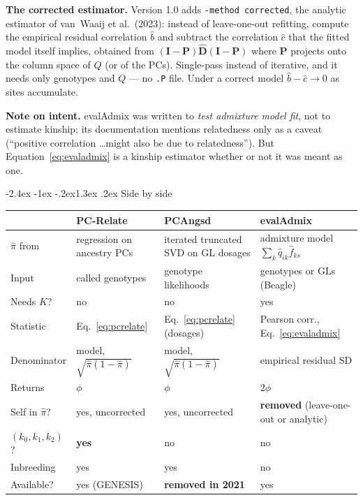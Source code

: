 \documentclass[10pt,a4paper]{article}
\makeatletter
\renewcommand\section{\@startsection{section}{1}{\z@}%
  {-2.4ex \@plus -1ex \@minus -.2ex}{1.3ex \@plus.2ex}%
  {\normalfont\large\bfseries\color{hdr}}}
\makeatother
\begin{document}
\textbf{The corrected estimator.} Version 1.0 adds \texttt{-method corrected}, the analytic estimator of
van~Waaij et al.\ (2023): instead of leave-one-out refitting, compute the empirical residual correlation
$\hat b$ and subtract the correlation $\hat c$ that the fitted model itself implies, obtained from
$(\mathbf{I}-\mathbf{P})\hat{\mathbf{D}}(\mathbf{I}-\mathbf{P})$ where $\mathbf{P}$ projects onto the column
space of $Q$ (or of the PCs). Single-pass instead of iterative, and it needs only genotypes and $Q$ --- no
\texttt{.P} file. Under a correct model $\hat b-\hat c\to 0$ as sites accumulate.

\textbf{Note on intent.} evalAdmix was written to \emph{test admixture model fit}, not to estimate kinship;
its documentation mentions relatedness only as a caveat (``positive correlation \dots might also be due to
relatedness''). But Equation~\eqref{eq:evaladmix} is a kinship estimator whether or not it was meant as one.

\section{Side by side}

\begin{center}
\small
\begin{tabular}{@{}>{\raggedright\arraybackslash}p{2.6cm}
                  >{\raggedright\arraybackslash}p{3.6cm}
                  >{\raggedright\arraybackslash}p{3.6cm}
                  >{\raggedright\arraybackslash}p{4.4cm}@{}}
\toprule
 & \textbf{PC-Relate} & \textbf{PCAngsd} & \textbf{evalAdmix} \\
\midrule
$\hat\pi$ from & regression on ancestry PCs & iterated truncated SVD on GL dosages & admixture model $\sum_k \hat q_{ik}\hat f_{ks}$ \\
Input & called genotypes & genotype likelihoods & genotypes or GLs (Beagle) \\
Needs $K$? & no & no & yes \\
Statistic & Eq.~\eqref{eq:pcrelate} & Eq.~\eqref{eq:pcrelate} (dosages) & Pearson corr., Eq.~\eqref{eq:evaladmix} \\
Denominator & model, $\sqrt{\hat\pi(1-\hat\pi)}$ & model, $\sqrt{\hat\pi(1-\hat\pi)}$ & empirical residual SD \\
Returns & $\phi$ & $\phi$ & $2\phi$ \\
Self in $\hat\pi$? & yes, uncorrected & yes, uncorrected & \textbf{removed} (leave-one-out or analytic) \\
$(k_0,k_1,k_2)$? & \textbf{yes} & no & no \\
Inbreeding & yes & yes & no \\
Available? & yes (GENESIS) & \textbf{removed in 2021} & yes \\
\bottomrule
\end{tabular}
\end{center}
\end{document}
